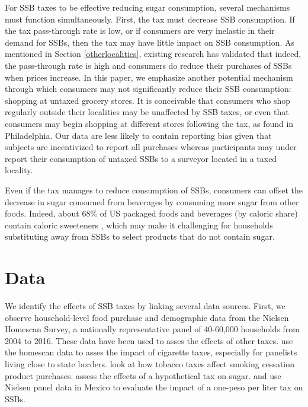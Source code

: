 \documentclass[12pt]{article}
\begin{document}
For SSB taxes to be effective reducing sugar consumption, several mechanisms must function simultaneously. First, the tax must decrease SSB consumption. If the tax pass-through rate is low, or if consumers are very inelastic in their demand for SSBs, then the tax may have little impact on SSB consumption. As mentioned in Section \ref{otherlocalities}, existing research has validated that indeed, the pass-through rate is high and consumers do reduce their purchases of SSBs when prices increase. In this paper, we emphasize another potential mechanism through which consumers may not significantly reduce their SSB consumption: shopping at untaxed grocery stores. It is conceivable that consumers who shop regularly outside their localities may be unaffected by SSB taxes, or even that consumers may begin shopping at different stores following the tax, as \textcite{cawley2020philly} found in Philadelphia. Our data are less likely to contain reporting bias given that subjects are incentivized to report all purchases whereas participants may under report their consumption of untaxed SSBs to a surveyor located in a taxed locality.

Even if the tax manages to reduce consumption of SSBs, consumers can offset the decrease in sugar consumed from beverages by consuming more sugar from other foods. Indeed, about 68\% of US packaged foods and beverages (by caloric share) contain caloric sweeteners \parencite{popkin2016sweetening}, which may make it challenging for households substituting away from SSBs to select products that do not contain sugar.

\section{Data} \label{data}

We identify the effects of SSB taxes by linking several data sources. First, we observe household-level food purchase and demographic data from the Nielsen Homescan Survey, a nationally representative panel of 40-60,000 households from 2004 to 2016. These data have been used to asses the effects of other taxes. \textcite{harding2012heterogeneous} use the homescan data to asses the impact of cigarette taxes, especially for panelists living close to state borders. \textcite{cotti2016effects} look at how tobacco taxes affect smoking cessation product purchases. \textcite{dharmasena2012intended} assess the effects of a hypothetical tax on sugar. \textcite{colchero2016beverage} and \textcite{colchero2017mexico} use Nielsen panel data in Mexico to evaluate the impact of a one-peso per liter tax on SSBs.
\end{document}
